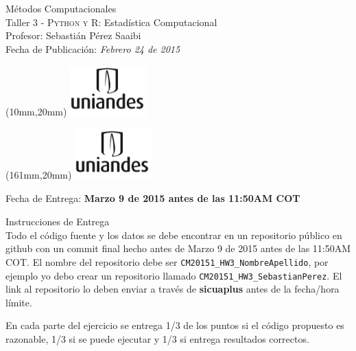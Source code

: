 \documentclass[11pt,letterpaper]{exam}
\begin{document}
\begin{center}
{\Large Métodos Computacionales} \\
Taller 3 - \textsc{Python y R}: Estadística Computacional \\
Profesor: Sebastián Pérez Saaibi\\
Fecha de Publicación: {\small \it Febrero 24 de 2015}\\
\end{center}

\begin{textblock*}{40mm}(10mm,20mm)
  \includegraphics[width=3cm]{logoUniandes.png}
\end{textblock*}

\begin{textblock*}{40mm}(161mm,20mm)
  \includegraphics[width=3cm]{logoUniandes.png}
\end{textblock*}

\vspace{0.5cm}

{\Large Fecha de Entrega:  \bf Marzo 9 de 2015 antes de las 11:50AM COT}

\vspace{0.5cm}

{\Large Instrucciones de Entrega}\\


Todo el código fuente y los datos se debe encontrar en un repositorio público en github con un commit final hecho antes de Marzo 9 de 2015 antes de las 11:50AM COT. El nombre del repositorio debe ser \verb+CM20151_HW3_NombreApellido+, por ejemplo yo debo crear un repositorio llamado \verb+CM20151_HW3_SebastianPerez+. El link al repositorio lo deben enviar a través de \textbf{sicuaplus} antes de la fecha/hora límite.

En cada parte del ejercicio se entrega 1/3  de los puntos si el código propuesto es razonable, 1/3 si se puede ejecutar y 1/3 si entrega resultados correctos.

\vspace{0.3 cm}
\end{document}
